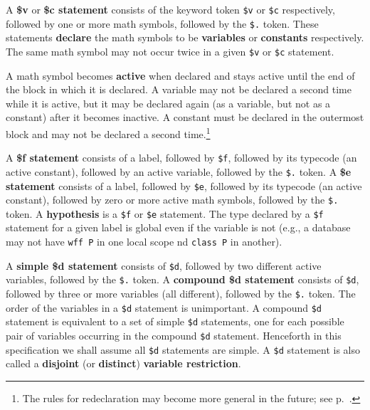 
A {\bf \$v} or {\bf \$c statement} consists of the keyword token \texttt{\$v} or \texttt{\$c} respectively,
followed by one or more math symbols,
followed by the \texttt{\$.} token.
These
statements {\bf declare} the math symbols to be {\bf
variables} or {\bf constants}
respectively. The same math symbol may not occur twice in a given \texttt{\$v} or
\texttt{\$c} statement.


A math symbol becomes {\bf active} when declared
and stays active until the end of the block in which it is declared.  A
variable may not be declared a second time while it is active, but it
may be declared again (as a variable, but not as a constant) after it
becomes inactive.  A constant must be declared in the outermost block and may
not be declared a second time.\footnote{The rules for redeclaration may
become more general in the future;
see p.~\pageref{redeclarationf}.}

A {\bf \$f statement} consists of a label,
followed by \texttt{\$f}, followed by its typecode (an active constant),
followed by an
active variable, followed by the \texttt{\$.} token.  A {\bf \$e
statement} consists of a label, followed
by \texttt{\$e}, followed by its typecode (an active constant),
followed by zero or more
active math symbols, followed by the \texttt{\$.} token.  A {\bf
hypothesis} is a \texttt{\$f} or \texttt{\$e}
statement.
The type declared by a \texttt{\$f} statement for a given label
is global even if the variable is not
(e.g., a database may not have \texttt{wff P} in one local scope
nd \texttt{class P} in another).

A {\bf simple \$d statement}
consists of \texttt{\$d}, followed by two different active variables,
followed by the \texttt{\$.} token.  A {\bf compound \$d
statement} consists of
\texttt{\$d}, followed by three or more variables (all different),
followed by the \texttt{\$.} token.  The order of the variables in a
\texttt{\$d} statement is unimportant.  A compound \texttt{\$d}
statement is equivalent to a set of simple \texttt{\$d} statements, one
for each possible pair of variables occurring in the compound
\texttt{\$d} statement.  Henceforth in this specification we shall
assume all \texttt{\$d} statements are simple.  A \texttt{\$d} statement
is also called a {\bf disjoint} (or {\bf distinct}) {\bf variable
restriction}.

